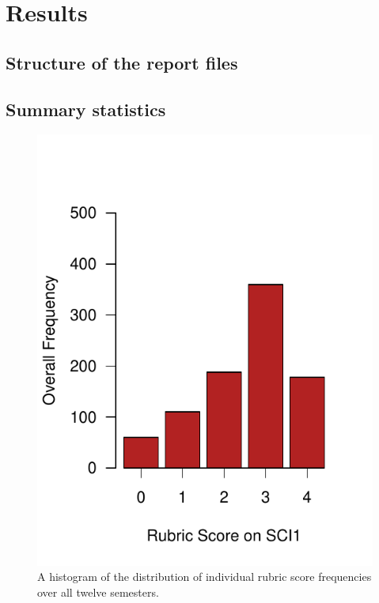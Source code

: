 \documentclass[fleqn,10pt]{SelfArx}\usepackage[]{graphicx}\usepackage[]{color}
\begin{document}
\section{Results}
\lipsum[1]

\subsection{Structure of the report files}
\lipsum[1]

\subsection{Summary statistics}

\begin{figure}[h]\centering

\includegraphics[width=\columnwidth]{./figure/histogram}
\protect\caption{A histogram of the distribution of individual rubric score frequencies over all twelve semesters.}
\label{fig:histogram}
\end{figure}
\end{document}
